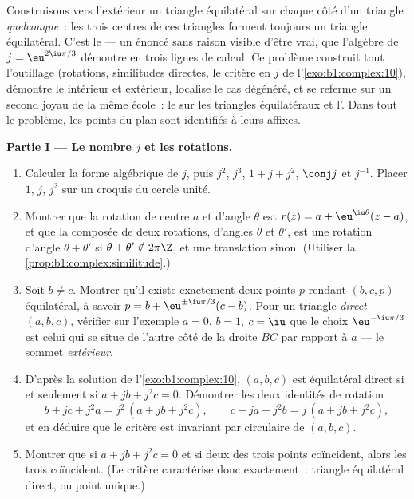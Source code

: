 \begin{problem}\label{pb:b1:complex:1}
Construisons vers l'extérieur un triangle équilatéral sur chaque
côté d'un triangle \emph{quelconque}~: les trois centres de ces
triangles forment toujours un triangle équilatéral. C'est le
 --- un énoncé sans
raison visible d'être vrai, que l'algèbre de $j = \eu^{2\iu\pi/3}$
démontre en trois lignes de calcul. Ce problème construit tout
l'outillage (rotations, similitudes directes, le critère en $j$ de
l'\cref{exo:b1:complex:10}), démontre le 
intérieur et extérieur, localise le cas dégénéré, et se referme sur
un second joyau de la même école~: le  sur
les triangles équilatéraux et l'. Dans tout le
problème, les points du plan sont identifiés à leurs affixes.

\medskip
\noindent\textbf{Partie I --- Le nombre $j$ et les rotations.}
\begin{enumerate}
  \item Calculer la forme algébrique de $j$, puis $j^2$, $j^3$, $1 +
        j + j^2$, $\conj j$ et $j^{-1}$. Placer $1$, $j$, $j^2$ sur
        un croquis du cercle unité.
  \item Montrer que la rotation de centre $a$ et d'angle $\theta$
        est $r(z) = a + \eu^{\iu\theta}(z - a)$, et que la composée
        de deux rotations, d'angles $\theta$ et $\theta'$, est une
        rotation d'angle $\theta + \theta'$ si $\theta + \theta'
        \notin 2\pi\Z$, et une translation sinon. (Utiliser la
        \cref{prop:b1:complex:similitude}.)
  \item Soit $b \neq c$. Montrer qu'il existe exactement deux points
        $p$ rendant $(b, c, p)$ équilatéral, à savoir $p = b +
        \eu^{\pm\iu\pi/3}(c - b)$. Pour un triangle \emph{direct}
        $(a, b, c)$, vérifier sur l'exemple $a = 0$, $b = 1$, $c =
        \iu$ que le choix $\eu^{-\iu\pi/3}$ est celui qui se situe
        de l'autre côté de la droite $BC$ par rapport à $a$ --- le
        sommet \emph{extérieur}.
  \item D'après la solution de l'\cref{exo:b1:complex:10}, $(a, b,
        c)$ est équilatéral direct si et seulement si $a + jb + j^2c
        = 0$. Démontrer les deux identités de rotation
        \[
        b + jc + j^2a = j^2\,(a + jb + j^2c),
        \qquad
        c + ja + j^2b = j\,(a + jb + j^2c),
        \]
        et en déduire que le critère est invariant par 
        circulaire de $(a, b, c)$.
  \item Montrer que si $a + jb + j^2c = 0$ et si deux des trois
        points coïncident, alors les trois coïncident. (Le critère
        caractérise donc exactement~: triangle équilatéral direct,
        ou point unique.)
\end{enumerate}


\end{problem}
